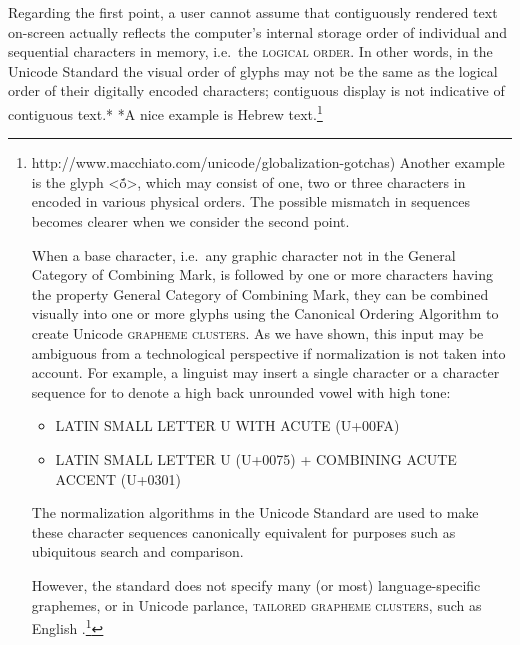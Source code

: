 {{{{{{{{{{{{{{{{{{{{{{{{{{{{{{{{{{{{{{{{{{{{{{{{{{{{{{{Regarding the first point, a user cannot assume that contiguously rendered text on-screen actually reflects the computer's internal storage order of individual and sequential characters in memory, i.e.~the \textsc{logical order}. In other words, in the Unicode Standard the visual order of glyphs may not be the same as the logical order of their digitally encoded characters; contiguous display is not indicative of contiguous text.* *A nice example is Hebrew text.\footnote{http://www.macchiato.com/unicode/globalization-gotchas) Another example is the glyph <ṍ>, which may consist of one, two or three characters in encoded in various physical orders. The possible mismatch in sequences becomes clearer when we consider the second point.

When a base character, i.e.~any graphic character not in the General Category of Combining Mark, is followed by one or more characters having the property General Category of Combining Mark, they can be combined visually into one or more glyphs using the Canonical Ordering Algorithm to create Unicode \textsc{grapheme clusters}. As we have shown, this input may be ambiguous from a technological perspective if normalization is not taken into account. For example, a linguist may insert a single character or a character sequence for to denote a high back unrounded vowel with high tone:
\begin{itemize}
	\item LATIN SMALL LETTER U WITH ACUTE (U+00FA) 
	\item LATIN SMALL LETTER U (U+0075) + COMBINING ACUTE ACCENT (U+0301) 
\end{itemize}

The normalization algorithms in the Unicode Standard are used to make these character sequences canonically equivalent for purposes such as ubiquitous search and comparison.

However, the standard does not specify many (or most) language-specific graphemes, or in Unicode parlance, \textsc{tailored grapheme clusters}, such as English .\footnote{Some (unfortunate) exceptions included for legacy purposes, and used incorrectly by linguists, include digraphs like LATIN SMALL LETTER TS DIGRAPH at U+02A6 or LATIN SMALL LETTER DEZH DIGRAPH at U+02A4. These and other digraphs are encoded in the Unicode Standard's IPA Extensions block.) For technological reasons, these language-specific tailored grapheme clusters must be defined outside of the Unicode Standard, in what are called (language-specific) Unicode Locale Descriptions.\footnote{http://www.unicode.org/reports/tr35/) The encoding of these multiple character sequences in Locale Descriptions is beyond the need (or technical ability) of many linguists; thus we have developed a simpler approach which we used in our own research and describe in detailed in Section XXX. Basically, the description of writing systems for lower resource languages, and in particular for document-specific descriptions (e.g.~different descriptions of the same language with different orthographies), requires an orthographic description at the (tailored) grapheme (cluster) level.

}}}}}}}}}}}}}}}}}}}}}}}}}}}}}}}}}}}}}}}}}}}}}}}}}}}}}}}}}}
